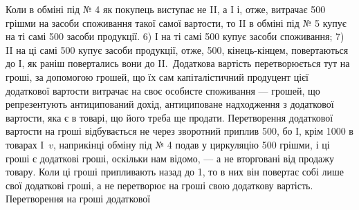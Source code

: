 Коли в обміні під № 4 як покупець виступає не II, а І і, отже, витрачає
500 грішми на засоби споживання такої самої вартости, то II
в обміні під № 5 купує на ті самі 500 засоби продукції.
6) І на ті самі 500 купує засоби споживання; 7) II на ці самі
500 купує засоби продукції, отже, 500, кінець-кінцем,
повертаються до І, як раніш повертались вони до II.~Додаткова вартість
перетворюється тут на гроші, за допомогою грошей, що їх сам капіталістичний
продуцент цієї додаткової вартости витрачає на своє особисте
споживання — грошей, що репрезентують антиципований дохід, антициповане
надходження з додаткової вартости, яка є в товарі, що його треба
ще продати. Перетворення додаткової вартости на гроші відбувається не
через зворотний приплив 500, бо І, крім 1000
в товарах І~$v$, наприкінці обміну під № 4 подав у циркуляцію 500 грішми, і ці гроші є додаткові гроші, оскільки нам відомо, — а не
вторговані від продажу товару. Коли ці гроші припливають назад до 1,
то в них він повертає собі лише свої додаткові гроші, а не перетворює
на гроші свою додаткову вартість. Перетворення на гроші додаткової
\parbreak{}  %
